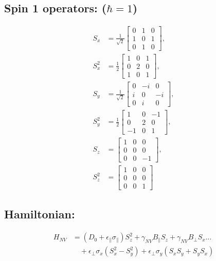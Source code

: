 \subsection*{Spin 1 operators: ($\hbar = 1$)} 

\begin{align}
S_x &= \frac{1}{\sqrt{2}}
\begin{bmatrix}
0 & 1 & 0 \\
1 & 0 & 1 \\
0 & 1 & 0
\end{bmatrix}, \\
S_x^2 &= \frac{1}{2}
\begin{bmatrix}
1 & 0 & 1 \\
0 & 2 & 0 \\
1 & 0 & 1
\end{bmatrix}, \\
S_y &= \frac{1}{\sqrt{2}} 
\begin{bmatrix}
0 & -i & 0 \\
i & 0 & -i \\
0 & i & 0
\end{bmatrix}, \\
S_y^2 &= \frac{1}{2}
\begin{bmatrix}
1 & 0 & -1 \\
0 & 2 & 0 \\
-1 & 0 & 1
\end{bmatrix}, \\
S_z &= 
\begin{bmatrix}
1 & 0 & 0 \\
0 & 0 & 0 \\
0 & 0 & -1
\end{bmatrix}, \\
S_z^2 &= 
\begin{bmatrix}
1 & 0 & 0 \\
0 & 0 & 0 \\
0 & 0 & 1
\end{bmatrix}
\end{align}





\subsection*{Hamiltonian:}
\begin{align}
H_{NV} &= \left(D_0 + \epsilon_{\parallel}\sigma_{\parallel}\right)S_z^2 + \gamma_{NV}B_{\parallel}S_z + \gamma_{NV}B_{\perp}S_x ... \nonumber \\
&\quad + \epsilon_{\perp}\sigma_x(S_x^2 - S_y^2) + \epsilon_{\perp}\sigma_y(S_xS_y + S_yS_x)
\end{align}
\par
{}

